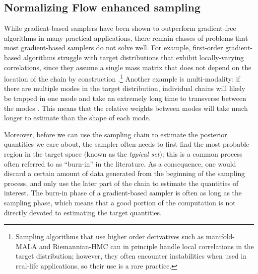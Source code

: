 \documentclass[twocolumn]{aastex631}
\begin{document}
\subsection{Normalizing Flow enhanced sampling}
\label{sec:flow}

While gradient-based samplers have been shown to outperform gradient-free
algorithms in many practical applications, there remain classes of problems
that most gradient-based samplers do not solve well. For example, first-order
gradient-based algorithms struggle with target distributions that exhibit
locally-varying correlations, since they assume a single mass matrix that does
not depend on the location of the chain by construction
\cite{2017arXiv170102434B}.\footnote{Sampling algorithms that use higher order
derivatives such as manifold-MALA and Riemannian-HMC \cite{RMHMC} can in
principle handle local correlations in the target distribution; however, they
often encounter instabilities when used in real-life applications, so their use
is a rare practice.} Another example is multi-modality: if there are multiple
modes in the target distribution, individual chains will likely be trapped in
one mode and take an extremely long time to transverse between the modes
\cite{2018arXiv180803230M}.  This means that the relative weights between modes
will take much longer to estimate than the shape of each mode.

Moreover, before we can use the sampling chain to estimate the posterior
quantities we care about, the sampler often needs to first find the most
probable region in the target space (known as the \emph{typical set}); this is
a common process often referred to as ``burn-in'' in the literature. As a
consequence, one would discard a certain amount of data generated from the
beginning of the sampling process, and only use the later part of the chain to
estimate the quantities of interest. The burn-in phase of a gradient-based
sampler is often as long as the sampling phase, which means that a good portion
of the computation is not directly devoted to estimating the target quantities.
\end{document}
